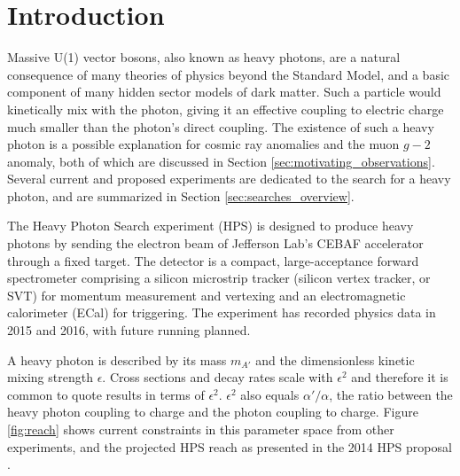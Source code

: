\chapter{Introduction}
Massive U(1) vector bosons, also known as heavy photons, are a natural consequence of many theories of physics beyond the Standard Model, and a basic component of many hidden sector models of dark matter.
Such a particle would kinetically mix with the photon, giving it an effective coupling to electric charge much smaller than the photon's direct coupling.
The existence of such a heavy photon is a possible explanation for cosmic ray anomalies and the muon $g-2$ anomaly, both of which are discussed in Section \ref{sec:motivating_observations}.
Several current and proposed experiments are dedicated to the search for a heavy photon, and are summarized in Section \ref{sec:searches_overview}.

The Heavy Photon Search experiment (HPS) is designed to produce heavy photons by sending the electron beam of Jefferson Lab's CEBAF accelerator through a fixed target.
The detector is a compact, large-acceptance forward spectrometer comprising a silicon microstrip tracker (silicon vertex tracker, or SVT) for momentum measurement and vertexing and an electromagnetic calorimeter (ECal) for triggering.
The experiment has recorded physics data in 2015 and 2016, with future running planned.

A heavy photon is described by its mass $m_{A'}$ and the dimensionless kinetic mixing strength $\epsilon$.
Cross sections and decay rates scale with $\epsilon^2$ and therefore it is common to quote results in terms of $\epsilon^2$.
$\epsilon^2$ also equals $\alpha'/\alpha$, the ratio between the heavy photon coupling to charge and the photon coupling to charge.
Figure \ref{fig:reach} shows current constraints in this parameter space from other experiments, and the projected HPS reach as presented in the 2014 HPS proposal \cite{collaboration_heavy_2013}.


